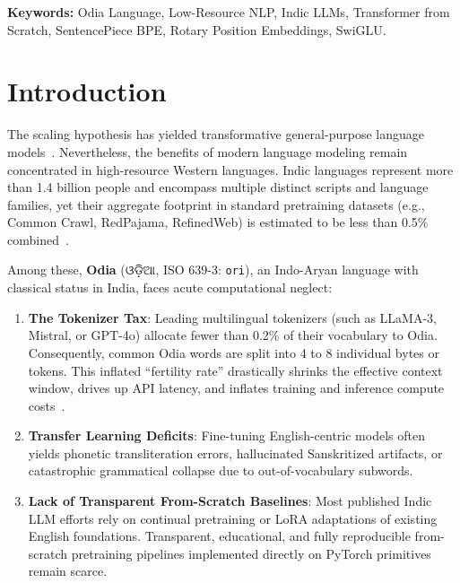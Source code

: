\documentclass[10pt,twocolumn,letterpaper]{article}
\newcommand{\odia}[1]{{\odiafont #1}}
\newcommand{\odia}[1]{\textit{#1}}
\begin{document}
\vspace{0.5em}
\noindent\textbf{Keywords:} Odia Language, Low-Resource NLP, Indic LLMs, Transformer from Scratch, SentencePiece BPE, Rotary Position Embeddings, SwiGLU.

\section{Introduction}

The scaling hypothesis has yielded transformative general-purpose language models~\cite{brown2020language,touvron2023llama,achiam2023gpt}. Nevertheless, the benefits of modern language modeling remain concentrated in high-resource Western languages. Indic languages represent more than 1.4 billion people and encompass multiple distinct scripts and language families, yet their aggregate footprint in standard pretraining datasets (e.g., Common Crawl, RedPajama, RefinedWeb) is estimated to be less than 0.5\% combined~\cite{doddapaneni2023towards}.

Among these, \textbf{Odia} (\odia{ଓଡ଼ିଆ}, ISO 639-3: \texttt{ori}), an Indo-Aryan language with classical status in India, faces acute computational neglect:
\begin{enumerate}
    \item \textbf{The Tokenizer Tax}: Leading multilingual tokenizers (such as LLaMA-3, Mistral, or GPT-4o) allocate fewer than 0.2\% of their vocabulary to Odia. Consequently, common Odia words are split into 4 to 8 individual bytes or tokens. This inflated ``fertility rate'' drastically shrinks the effective context window, drives up API latency, and inflates training and inference compute costs~\cite{petrov2023language}.
    \item \textbf{Transfer Learning Deficits}: Fine-tuning English-centric models often yields phonetic transliteration errors, hallucinated Sanskritized artifacts, or catastrophic grammatical collapse due to out-of-vocabulary subwords.
    \item \textbf{Lack of Transparent From-Scratch Baselines}: Most published Indic LLM efforts rely on continual pretraining or LoRA adaptations of existing English foundations. Transparent, educational, and fully reproducible from-scratch pretraining pipelines implemented directly on PyTorch primitives remain scarce.
\end{enumerate}
\end{document}
